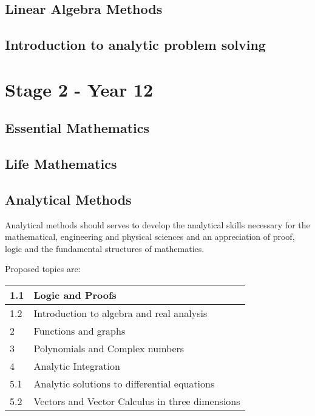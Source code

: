 \documentclass[12pt]{report}
\begin{document}
\subsection{Linear Algebra Methods}
\subsection{Introduction to analytic problem solving}

\section{Stage 2 - Year 12}

\subsection{Essential Mathematics}
\subsection{Life Mathematics}
\subsection{Analytical Methods}
    Analytical methods should serves to develop the analytical skills necessary for the mathematical, engineering and physical sciences and an appreciation of proof, logic and the fundamental structures of mathematics.

    Proposed topics are:
    \begin{table}[H]
        \centering
        \begin{tabular}{|l|l|}
        \hline
            1.1 & Logic and Proofs \\ \hline
            1.2 & Introduction to algebra and real analysis \\ \hline
            2 & Functions and graphs \\ \hline 
            3 & Polynomials and Complex numbers \\ \hline
            4 & Analytic Integration  \\ \hline 
            5.1 & Analytic solutions to differential equations \\ \hline
            5.2 & Vectors and Vector Calculus in three dimensions\\ \hline
        \end{tabular}
    \end{table}
\end{document}
